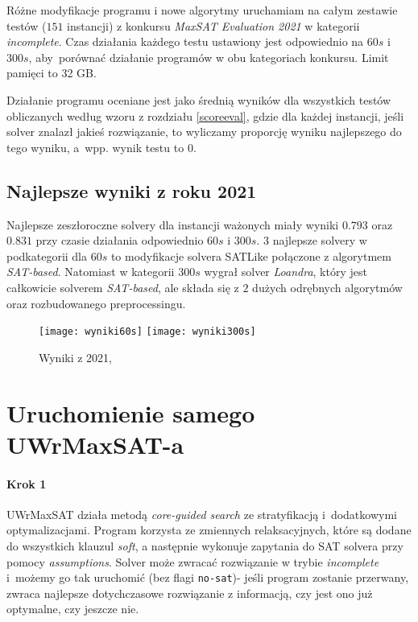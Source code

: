 \documentclass[shortabstract]{iithesis}
\begin{document}
Różne modyfikacje programu i nowe algorytmy uruchamiam na całym zestawie testów ($151$ instancji) z konkursu \textit{MaxSAT Evaluation 2021} w kategorii \textit{incomplete}. 
Czas działania każdego testu ustawiony jest odpowiednio na $60s$ i $300s$, aby~porównać działanie programów w obu kategoriach konkursu.
Limit pamięci to 32 GB.

Działanie programu oceniane jest jako średnią wyników dla wszystkich testów obliczanych według wzoru z rozdziału \ref{scoreeval}, gdzie dla każdej instancji, jeśli solver znalazł jakieś rozwiązanie, to wyliczamy proporcję wyniku najlepszego do tego wyniku, a~wpp. wynik testu to $0$.

\subsection{Najlepsze wyniki z roku 2021}
Najlepsze zeszłoroczne solvery dla instancji ważonych miały wyniki $0.793$ oraz $0.831$ przy czasie działania odpowiednio $60s$ i $300s$. 
$3$ najlepsze solvery w podkategorii dla $60s$ to modyfikacje solvera SATLike połączone z algorytmem \textit{SAT-based}.
Natomiast w kategorii $300s$ wygrał solver \textit{Loandra}, który jest całkowicie solverem \textit{SAT-based}, ale składa się z $2$ dużych odrębnych algorytmów oraz rozbudowanego preprocessingu.

\begin{figure}[h]
	\texttt{[image: wyniki60s]}
	\texttt{[image: wyniki300s]}
	\label{wyniki2021}
	\caption{Wyniki z 2021, \cite{maxsateval}}
	
\end{figure}

\section{Uruchomienie samego UWrMaxSAT-a}
\paragraph{Krok 1}
UWrMaxSAT działa metodą \textit{core-guided search} ze stratyfikacją \cite{stratification} i~dodatkowymi optymalizacjami. Program korzysta ze zmiennych relaksacyjnych, które są dodane do wszystkich klauzul \textit{soft}, a następnie wykonuje zapytania do SAT solvera przy pomocy \textit{assumptions}. Solver może zwracać rozwiązanie w trybie \textit{incomplete} i~możemy go tak uruchomić (bez flagi \texttt{no-sat})- jeśli program zostanie przerwany, zwraca najlepsze dotychczasowe rozwiązanie z informacją, czy jest ono już optymalne, czy jeszcze nie. 
\end{document}
